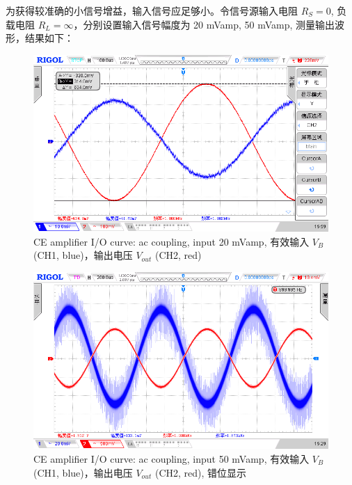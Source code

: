 \documentclass[UTF8]{article}
\begin{document}
为获得较准确的小信号增益，输入信号应足够小。令信号源输入电阻 $R_S = 0 $, 负载电阻 $R_L = \infty$，分别设置输入信号幅度为 20 mVamp, 50 mVamp, 测量输出波形，结果如下：

\begin{figure}[H]\centering
    \includegraphics[width=\columnwidth]{LCE-02-三极管/assets/原始增益 input 20 mVamp (40 mVpp), R_S = 0, R_L = inf.png}
    \caption{CE amplifier I/O curve: ac coupling, input 20 mVamp, 有效输入 $V_{B}$ (CH1, blue)，输出电压 $V_{out}$ (CH2, red)}
\end{figure}
\begin{figure}[H]\centering
    \includegraphics[width=\columnwidth]{LCE-02-三极管/assets/CE input 50mVamp (R_S = 0), 正常线性放大.png}
    \caption{CE amplifier I/O curve: ac coupling, input 50 mVamp, 有效输入 $V_{B}$ (CH1, blue)，输出电压 $V_{out}$ (CH2, red), 错位显示}
\end{figure}
\end{document}
